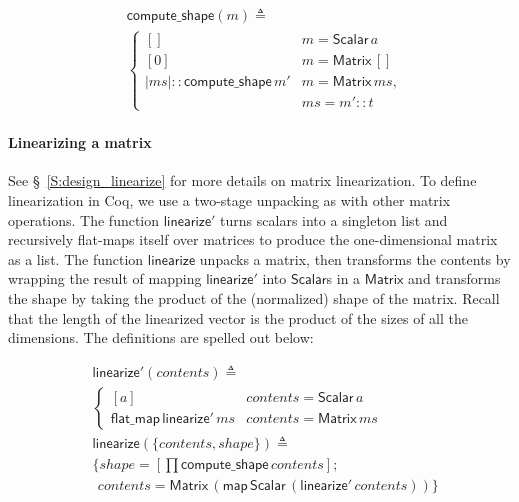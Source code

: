 \documentclass[11pt,conference]{IEEEtran}
\newcommand{\var}[1]{\mathit{#1}}
\newcommand{\func}[1]{\mathsf{#1}}
\theoremstyle{plain} %
\theoremstyle{definition}
\theoremstyle{remark}
\begin{document}
\begin{align*}
    & \func{compute\_shape}(\var{m}) \triangleq \\
    & \begin{cases}
        [] & m = \func{Scalar}\, a \\
        [0] & m = \func{Matrix}\, [] \\
        |\var{ms}| :: \func{compute\_shape}\, m' & m = \func{Matrix}\, \var{ms}, \\
        & \var{ms} = m'::t
    \end{cases}
\end{align*}

\paragraph{Linearizing a matrix} See \S~\ref{S:design_linearize} for more
details on matrix linearization. To define linearization in Coq, we use a
two-stage unpacking as with other matrix operations. The function
\(\func{linearize'}\) turns scalars into a singleton list and recursively
flat-maps itself over matrices to produce the one-dimensional matrix as a list.
The function \(\func{linearize}\) unpacks a matrix, then transforms the contents
by wrapping the result of mapping \(\func{linearize'}\) into \(\func{Scalar}\)s
in a \(\func{Matrix}\) and transforms the shape by taking the product of the
(normalized) shape of the matrix. Recall that the length of the linearized
vector is the product of the sizes of all the dimensions. The definitions are
spelled out below:

\begin{align*}
    & \func{linearize'}(\var{contents}) \triangleq \\
    & \begin{cases}
        [\var{a}] & \var{contents} = \func{Scalar}\, \var{a} \\
        \func{flat\_map}\, \func{linearize'}\, \var{ms} & \var{contents} =
        \func{Matrix}\, ms
    \end{cases} \\
    & \func{linearize}(\{\var{contents}, \var{shape}\}) \triangleq \\
    & \{ \var{shape} = \left[\prod \func{compute\_shape}\, \var{contents}\right]; \\
    & \ \, \var{contents} = \func{Matrix}\, (\func{map}\, \func{Scalar}\, (\func{linearize'}\, \var{contents})) \}
\end{align*}
\end{document}
